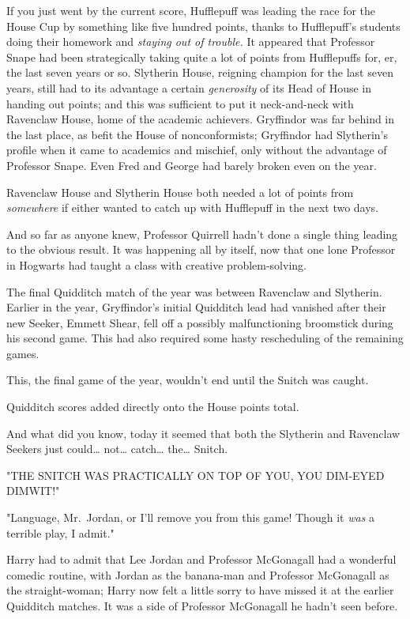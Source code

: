If you just went by the current score, Hufflepuff was leading the race for the 
House Cup by something like five hundred points, thanks to Hufflepuff's 
students doing their homework and \emph{staying out of trouble.} It appeared 
that Professor Snape had been strategically taking quite a lot of points from 
Hufflepuffs for, er, the last seven years or so. Slytherin House, reigning 
champion for the last seven years, still had to its advantage a certain 
\emph{generosity} of its Head of House in handing out points; and this was 
sufficient to put it neck-and-neck with Ravenclaw House, home of the academic 
achievers. Gryffindor was far behind in the last place, as befit the House of 
nonconformists; Gryffindor had Slytherin's profile when it came to academics 
and mischief, only without the advantage of Professor Snape. Even Fred and 
George had barely broken even on the year.

Ravenclaw House and Slytherin House both needed a lot of points from 
\emph{somewhere} if either wanted to catch up with Hufflepuff in the next two 
days.

And so far as anyone knew, Professor Quirrell hadn't done a single thing 
leading to the obvious result. It was happening all by itself, now that one 
lone Professor in Hogwarts had taught a class with creative problem-solving.

The final Quidditch match of the year was between Ravenclaw and Slytherin. 
Earlier in the year, Gryffindor's initial Quidditch lead had vanished after 
their new Seeker, Emmett Shear, fell off a possibly malfunctioning broomstick 
during his second game. This had also required some hasty rescheduling of the 
remaining games.

This, the final game of the year, wouldn't end until the Snitch was caught.

Quidditch scores added directly onto the House points total.

And what did you know, today it seemed that both the Slytherin and Ravenclaw 
Seekers just could{\ldots} not{\ldots} catch{\ldots} the{\ldots} Snitch.

"THE SNITCH WAS PRACTICALLY ON TOP OF YOU, YOU DIM-EYED DIMWIT!"

"Language, Mr.~Jordan, or I'll remove you from this game! Though it \emph{was} 
a terrible play, I admit."

Harry had to admit that Lee Jordan and Professor McGonagall had a wonderful 
comedic routine, with Jordan as the banana-man and Professor McGonagall as the 
straight-woman; Harry now felt a little sorry to have missed it at the earlier 
Quidditch matches. It was a side of Professor McGonagall he hadn't seen before.

